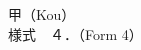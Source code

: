 \documentclass[
11pt, %
a4paper, %
oneside, %
BCOR5mm, %
]{article}
\theoremstyle{definition} %
\theoremstyle{plain} %
\theoremstyle{remark} %
\begin{document}

\noindent 甲（Kou） \\
様式　４．（Form 4）
\end{document}
